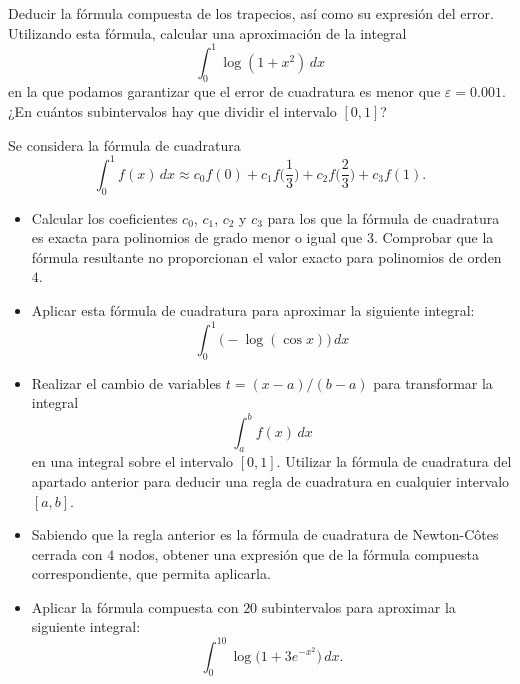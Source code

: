 \begin{EjerciciosPropuestos}
  \begin{problema}
    Deducir la fórmula compuesta de los trapecios, así como su
    expresión del error. Utilizando esta fórmula, calcular una
    aproximación de la integral
    $$
    \int_0^1 \log(1+x^2)\, dx
    $$
    en la que podamos garantizar que el error de cuadratura es menor que
    $\varepsilon=0.001$. ¿En cuántos subintervalos hay que dividir el
    intervalo $[0,1]$?
  \item Se considera la fórmula de cuadratura
    \begin{equation*}
      \int_0^1 f(x)\,dx \approx c_0 f(0) + c_1 f\bigg(\frac{1}{3}\bigg)
      + c_2 f\bigg(\frac{2}{3}\bigg) + c_3 f(1).
    \end{equation*}
    \begin{itemize}
    \item Calcular los coeficientes $c_0$, $c_1$, $c_2$ y $c_3$ para
      los que la fórmula de cuadratura es exacta para polinomios de
      grado menor o igual que $3$. Comprobar que la fórmula resultante
      no proporcionan el valor exacto para polinomios de orden $4$.
    \item Aplicar esta fórmula de cuadratura para aproximar la
      siguiente integral:
      \begin{equation*}
        \int_0^1 \big(-\log(\cos x) \big)\,dx
      \end{equation*}
    \item Realizar el cambio de variables $t=(x-a)/(b-a)$ para
      transformar la integral
      \begin{equation*}
        \int_a^b f(x)\, dx
      \end{equation*}
      en una integral sobre el intervalo $[0,1]$. Utilizar la fórmula
      de cuadratura del apartado anterior para deducir una
      regla de cuadratura en cualquier intervalo $[a,b]$.
    \item Sabiendo que la regla anterior es la fórmula de cuadratura
      de Newton-Côtes cerrada con $4$ nodos, obtener una expresión que
      de la fórmula compuesta correspondiente, que permita aplicarla.
    \item Aplicar la fórmula compuesta con $20$ subintervalos para
      aproximar la siguiente integral:
      \begin{equation*}
        \int_0^{10} \log\big(1+3e^{-x^2}\big)\,dx.
      \end{equation*}
    \end{itemize}
  \end{problema}


\end{EjerciciosPropuestos}
